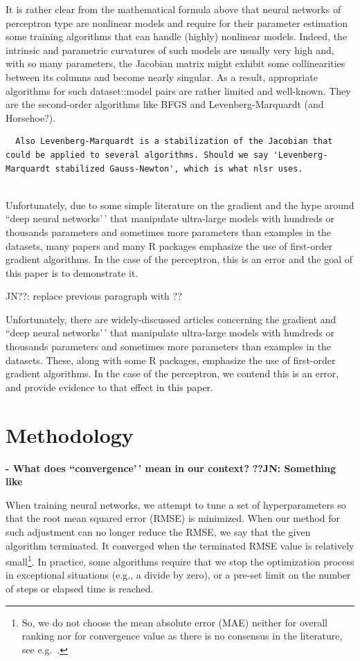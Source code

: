 It is rather clear from the mathematical formula above that neural
networks of perceptron type are nonlinear models and require for their
parameter estimation some training algorithms that can handle (highly)
nonlinear models. Indeed, the intrinsic and parametric curvatures of
such models are usually very high and, with so many parameters, the
Jacobian matrix might exhibit some collinearities between its columns
and become nearly singular. As a result, appropriate algorithms for such
dataset::model pairs are rather limited and well-known. They are the
second-order algorithms like BFGS and Levenberg-Marquardt (and
Horsehoe?).

\begin{verbatim}
  Also Levenberg-Marquardt is a stabilization of the Jacobian that could be applied to several algorithms. Should we say 'Levenberg-Marquardt stabilized Gauss-Newton', which is what nlsr uses.
  
\end{verbatim}

Unfortunately, due to some simple literature on the gradient and the
hype around ``deep neural networks'\,' that manipulate ultra-large
models with hundreds or thousands parameters and sometimes more
parameters than examples in the datasets, many papers and many R
packages emphasize the use of first-order gradient algorithms. In the
case of the perceptron, this is an error and the goal of this paper is
to demonstrate it.

JN??: replace previous paragraph with ??

Unfortunately, there are widely-discussed articles concerning the
gradient and ``deep neural networks'\,' that manipulate ultra-large
models with hundreds or thousands parameters and sometimes more
parameters than examples in the datasets. These, along with some R
packages, emphasize the use of first-order gradient algorithms. In the
case of the perceptron, we contend this is an error, and provide
evidence to that effect in this paper.

\hypertarget{methodology}{%
\section{Methodology}\label{methodology}}

\textbf{- What does ``convergence'\,' mean in our context?}
\textbf{??JN: Something like}

When training neural networks, we attempt to tune a set of
hyperparameters so that the root mean squared error (RMSE) is minimized.
When our method for such adjustment can no longer reduce the RMSE, we
say that the given algorithm terminated. It converged when the
terminated RMSE value is relatively small\footnote{So, we do not choose
  the mean absolute error (MAE) neither for overall ranking nor for
  convergence value as there is no consensus in the literature, see
  e.g.~\citep{willmott2005advantages,chai2014root}.}. In practice, some
algorithms require that we stop the optimization process in exceptional
situations (e.g., a divide by zero), or a pre-set limit on the number of
steps or elapsed time is reached.

